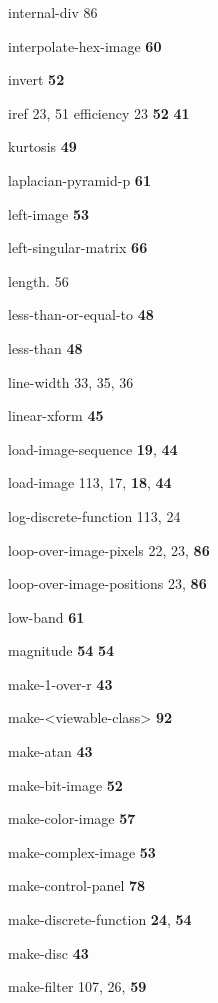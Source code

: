\begin{theindex}
\item {\ptt internal-div} 86
\item {\ptt interpolate-hex-image} {\bf 60}
\item {\ptt invert}
 {\bf 52}
\item {\ptt iref} 23, 51
\subitem efficiency 23
 {\bf 52}
 {\bf 41}
\item {\ptt kurtosis} {\bf 49}
\item {\ptt laplacian-pyramid-p} {\bf 61}
\item {\ptt left-image} {\bf 53}
\item {\ptt left-singular-matrix} {\bf 66}
\item {\ptt length.} 56
\item {\ptt less-than-or-equal-to}
 {\bf 48}
\item {\ptt less-than}
 {\bf 48}
\item {\ptt line-width} 33, 35, 36
\item {\ptt linear-xform}
 {\bf 45}
\item {\ptt load-image-sequence} {\bf 19}, {\bf 44}
\item {\ptt load-image} 113, 17, {\bf 18}, {\bf 44}
\item {\ptt log-discrete-function} 113, 24
\item {\ptt loop-over-image-pixels} 22, 23, {\bf 86}
\item {\ptt loop-over-image-positions} 23, {\bf 86}
\item {\ptt low-band}
 {\bf 61}
\item {\ptt magnitude}
 {\bf 54}
 {\bf 54}
\item {\ptt make-1-over-r} {\bf 43}
\item {\ptt make-<viewable-class>} {\bf 92}
\item {\ptt make-atan} {\bf 43}
\item {\ptt make-bit-image} {\bf 52}
\item {\ptt make-color-image} {\bf 57}
\item {\ptt make-complex-image} {\bf 53}
\item {\ptt make-control-panel} {\bf 78}
\item {\ptt make-discrete-function} {\bf 24}, {\bf 54}
\item {\ptt make-disc} {\bf 43}
\item {\ptt make-filter} 107, 26, {\bf 59}

\end{theindex}
